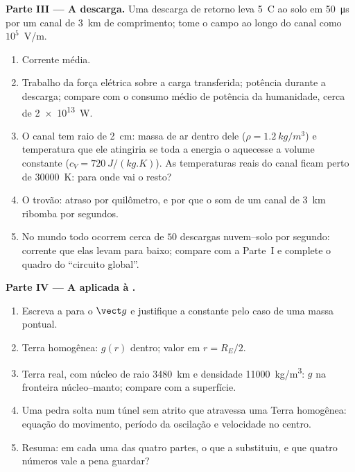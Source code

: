 \begin{problem}
\medskip
\noindent\textbf{Parte III --- A descarga.}
Uma descarga de retorno leva \qty{5}{C} ao solo em \qty{50}{\micro s}
por um canal de \qty{3}{km} de comprimento; tome o campo ao longo do canal
como $10^5$~V/m.
\begin{enumerate}[resume]
  \item Corrente média.
  \item Trabalho da força elétrica sobre a carga transferida; potência
        durante a descarga; compare com o consumo médio de potência da
        humanidade, cerca de \qty{2e13}{W}.
  \item O canal tem raio de \qty{2}{cm}: massa de ar dentro dele
        ($\rho = \qty{1.2}{kg/m^3}$) e temperatura que ele atingiria se
        toda a energia o aquecesse a volume constante ($c_V =
        \qty{720}{J/(kg.K)}$). As temperaturas reais do canal ficam perto de
        \qty{30000}{K}: para onde vai o resto?
  \item O trovão: atraso por quilômetro, e por que o som de um
        canal de \qty{3}{km} ribomba por segundos.
  \item No mundo todo ocorrem cerca de $50$ descargas nuvem--solo por segundo:
        corrente que elas levam para baixo; compare com a Parte~I e complete o
        quadro do ``circuito global''.
\end{enumerate}

\medskip
\noindent\textbf{Parte IV --- A  aplicada à .}
\begin{enumerate}[resume]
  \item Escreva a  para o  $\vect g$ e
        justifique a constante pelo caso de uma massa pontual.
  \item Terra homogênea: $g(r)$ dentro; valor em $r = R_E/2$.
  \item Terra real, com núcleo de raio \qty{3480}{km} e densidade
        \qty{11000}{kg/m^3}: $g$ na fronteira núcleo--manto; compare com
        a superfície.
  \item Uma pedra solta num túnel sem atrito que atravessa uma Terra
        homogênea: equação do movimento, período da oscilação e velocidade no
        centro.
  \item Resuma: em cada uma das quatro partes, o que a  substituiu,
        e que quatro números vale a pena guardar?
\end{enumerate}
\end{problem}
